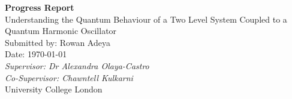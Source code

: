 \documentclass[12pt,a4paper]{article}
\begin{document}
\begin{titlepage}
    \centering
    \vspace*{2cm}
    \Huge\textbf{Progress Report} \\
    \vspace{2cm}
    \large{Understanding the Quantum Behaviour of a Two Level System Coupled to a Quantum Harmonic Oscillator} \\
    \vspace{1cm}
    Submitted by: Rowan Adeya \\
    Date: \today \\
    \vspace{1cm}
    \small{\textit{Supervisor: Dr Alexandra Olaya-Castro}} \\
    \small{\textit{Co-Supervisor: Chawntell Kulkarni}} \\
    

    \vfill
    \normalsize
    University College London
\end{titlepage}

\setcounter{page}{1}

\end{document}
